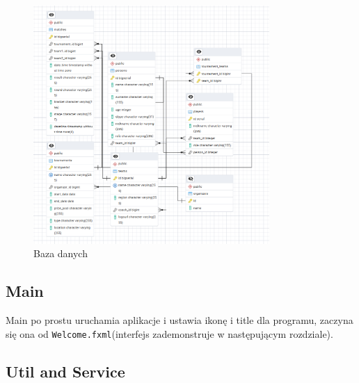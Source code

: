 \begin{figure}[h!]
    \centering
    \includegraphics[width=0.8\textwidth]{figures/Database.png}
    \caption{Baza danych \label{fig2}}
\end{figure}

\subsection{Main}

Main po prostu uruchamia aplikacje i ustawia ikonę i title dla programu, zaczyna się ona od \texttt{Welcome.fxml}(interfejs zademonstruje w następującym rozdziale).




\subsection{Util and Service}







